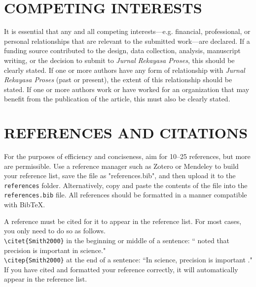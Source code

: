 \documentclass[twocolumn,twoside]{base/jrekpros}
\begin{document}
\section*{COMPETING INTERESTS}

It is essential that any and all competing interests—e.g. financial, professional, or personal relationships that are relevant to the submitted work—are declared. If a funding source contributed to the design, data collection, analysis, manuscript writing, or the decision to submit to \textit{Jurnal Rekayasa Proses}, this should be clearly stated. If one or more authors have any form of relationship with \textit{Jurnal Rekayasa Proses} (past or present), the extent of this relationship should be stated. If one or more authors work or have worked for an organization that may benefit from the publication of the article, this must also be clearly stated.

\section*{REFERENCES AND CITATIONS} %

For the purposes of efficiency and conciseness, aim for 10--25 references, but more are permissible. Use a reference manager such as Zotero or Mendeley to build your reference list, save the file as "references.bib", and then upload it to the \verb|references| folder. Alternatively, copy and paste the contents of the file into the \verb|references.bib| file. All references should be formatted in a manner compatible with BibTeX.

A reference must be cited for it to appear in the reference list. For most cases, you only need to do so as follows. \\

\noindent \verb|\citet{Smith2000}| in the beginning or middle of a sentence: ``\citet{Smith2000} noted that precision is important in science." \\

\noindent \verb|\citep{Smith2000}| at the end of a sentence: ``In science, precision is important \citep{Smith2000}."\\

\noindent If you have cited and formatted your reference correctly, it will automatically appear in the reference list.



\atColsEnd{\vfill} %
\end{document}
